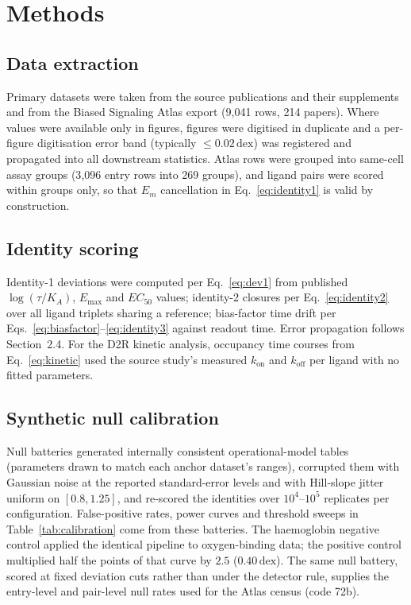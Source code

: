 ﻿\documentclass[11pt,a4paper]{article}
\newcommand{\dex}{\ensuremath{\,\mathrm{dex}}}
\newcommand{\logR}{\ensuremath{\log(\tau/K_{\!A})}}
\newcommand{\Emax}{\ensuremath{E_{\max}}}
\newcommand{\ECfifty}{\ensuremath{EC_{50}}}
\begin{document}
\section{Methods}
\label{sec:methods}

\subsection{Data extraction}

Primary datasets were taken from the source publications and their supplements \cite{KleinHerenbrink2016,Wingler2020,Gillis2020,StahlBohn2022,Sachdev2024} and from the Biased Signaling Atlas export \cite{BSA} (9{,}041 rows, 214 papers). Where values were available only in figures, figures were digitised in duplicate and a per-figure digitisation error band (typically $\leq0.02\dex$) was registered and propagated into all downstream statistics. Atlas rows were grouped into same-cell assay groups (3{,}096 entry rows into 269 groups), and ligand pairs were scored within groups only, so that $E_m$ cancellation in Eq.~\eqref{eq:identity1} is valid by construction.

\subsection{Identity scoring}

Identity-1 deviations were computed per Eq.~\eqref{eq:dev1} from published $\logR$, $\Emax$ and $\ECfifty$ values; identity-2 closures per Eq.~\eqref{eq:identity2} over all ligand triplets sharing a reference; bias-factor time drift per Eqs.~\eqref{eq:biasfactor}--\eqref{eq:identity3} against readout time. Error propagation follows Section~2.4. For the D2R kinetic analysis, occupancy time courses from Eq.~\eqref{eq:kinetic} used the source study's measured $k_{\mathrm{on}}$ and $k_{\mathrm{off}}$ per ligand with no fitted parameters.

\subsection{Synthetic null calibration}

Null batteries generated internally consistent operational-model tables (parameters drawn to match each anchor dataset's ranges), corrupted them with Gaussian noise at the reported standard-error levels and with Hill-slope jitter uniform on $[0.8,1.25]$, and re-scored the identities over $10^{4}$--$10^{5}$ replicates per configuration. False-positive rates, power curves and threshold sweeps in Table~\ref{tab:calibration} come from these batteries. The haemoglobin negative control applied the identical pipeline to oxygen-binding data; the positive control multiplied half the points of that curve by $2.5$ ($0.40\dex$). The same null battery, scored at fixed deviation cuts rather than under the detector rule, supplies the entry-level and pair-level null rates used for the Atlas census (code 72b).
\end{document}
